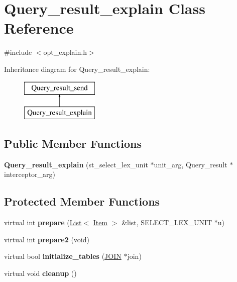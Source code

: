 \hypertarget{classQuery__result__explain}{}\section{Query\+\_\+result\+\_\+explain Class Reference}
\label{classQuery__result__explain}


{\ttfamily \#include $<$opt\+\_\+explain.\+h$>$}

Inheritance diagram for Query\+\_\+result\+\_\+explain\+:\begin{figure}[H]
\begin{center}
\leavevmode
\includegraphics[height=2.000000cm]{classQuery__result__explain}
\end{center}
\end{figure}
\subsection*{Public Member Functions}
\begin{DoxyCompactItemize}
\item 
\mbox{\label{classQuery__result__explain_aba4aa39505e977f0a72ee04d870b610a}} 
{\bfseries Query\+\_\+result\+\_\+explain} (st\+\_\+select\+\_\+lex\+\_\+unit $\ast$unit\+\_\+arg, Query\+\_\+result $\ast$interceptor\+\_\+arg)
\end{DoxyCompactItemize}
\subsection*{Protected Member Functions}
\begin{DoxyCompactItemize}
\item 
\mbox{\label{classQuery__result__explain_a5cf6fdfb0a042aa2d40ac9790f1b1e06}} 
virtual int {\bfseries prepare} (\mbox{\hyperlink{classList}{List}}$<$ \mbox{\hyperlink{classItem}{Item}} $>$ \&list, S\+E\+L\+E\+C\+T\+\_\+\+L\+E\+X\+\_\+\+U\+N\+IT $\ast$u)
\item 
\mbox{\label{classQuery__result__explain_a6db5c9d513a5dffb43c03b6aee24554b}} 
virtual int {\bfseries prepare2} (void)
\item 
\mbox{\label{classQuery__result__explain_ad62b1f37ece85a5f352ea1bdce231f5d}} 
virtual bool {\bfseries initialize\+\_\+tables} (\mbox{\hyperlink{classJOIN}{J\+O\+IN}} $\ast$join)
\item 
\mbox{\label{classQuery__result__explain_a6bbad61d28df50465ba673e437a9c71b}} 
virtual void {\bfseries cleanup} ()
\end{DoxyCompactItemize}
